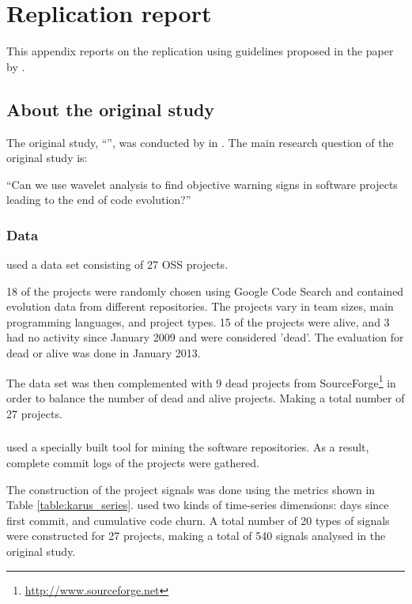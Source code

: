 \chapter{Replication report}
\label{replication}
This appendix reports on the replication using guidelines proposed in the
paper by \citet{carver}.

\section*{About the original study}
The original study, ``\repltitle{}'', was conducted by \replauthor{} in
\citeyear{karus2013}. The main research question of the original study is:

``Can we use wavelet analysis to find objective warning signs in software
projects leading to the end of code evolution?''

\subsection*{Data}
\citeauthor{karus2013} used a data set consisting of 27 OSS projects.

18 of the projects were randomly chosen using Google Code Search and contained
evolution data from different repositories. The projects vary in team sizes,
main programming languages, and project types. 15 of the projects were alive,
and 3 had no activity since January 2009 and were considered 'dead'. The
evaluation for dead or alive was done in January 2013.

The data set was then complemented with 9 dead projects from
SourceForge\footnote{\url{http://www.sourceforge.net}} in order to balance the
number of dead and alive projects. Making a total number of 27 projects.

\paragraph{}
\citeauthor{karus2013} used a specially built tool for mining the software
repositories. As a result, complete commit logs of the projects were gathered.

The construction of the project signals was done using the metrics shown in
Table \ref{table:karus_series}. \citeauthor{karus2013} used two kinds of
time-series dimensions: days since first commit, and cumulative code churn. A
total number of 20 types of signals were constructed for 27 projects, making a
total of 540 signals analysed in the original study.

